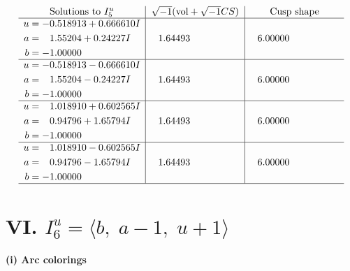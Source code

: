 \documentclass[1p]{elsarticle_modified}
\theoremstyle{definition}
\newcommand{\I}{\sqrt{-1}}
\begin{document}
$$\begin{array}{c|c|c}  
\text{Solutions to }I^u_{5}& \I (\text{vol} + \sqrt{-1}CS) & \text{Cusp shape}\\
 \hline 
\begin{aligned}
u &= -0.518913 + 0.666610 I \\
a &= \phantom{-}1.55204 + 0.24227 I \\
b &= -1.00000\phantom{ +0.000000I}\end{aligned}
 & \phantom{-}1.64493\phantom{ +0.000000I} & \phantom{-}6.00000\phantom{ +0.000000I} \\ \hline\begin{aligned}
u &= -0.518913 - 0.666610 I \\
a &= \phantom{-}1.55204 - 0.24227 I \\
b &= -1.00000\phantom{ +0.000000I}\end{aligned}
 & \phantom{-}1.64493\phantom{ +0.000000I} & \phantom{-}6.00000\phantom{ +0.000000I} \\ \hline\begin{aligned}
u &= \phantom{-}1.018910 + 0.602565 I \\
a &= \phantom{-}0.94796 + 1.65794 I \\
b &= -1.00000\phantom{ +0.000000I}\end{aligned}
 & \phantom{-}1.64493\phantom{ +0.000000I} & \phantom{-}6.00000\phantom{ +0.000000I} \\ \hline\begin{aligned}
u &= \phantom{-}1.018910 - 0.602565 I \\
a &= \phantom{-}0.94796 - 1.65794 I \\
b &= -1.00000\phantom{ +0.000000I}\end{aligned}
 & \phantom{-}1.64493\phantom{ +0.000000I} & \phantom{-}6.00000\phantom{ +0.000000I}\\
 \hline 
 \end{array}$$\newpage\newpage\renewcommand{\arraystretch}{1}
\centering \section*{VI. $I^u_{6}= \langle b,\;a-1,\;u+1 \rangle$}
\flushleft \textbf{(i) Arc colorings}\\
\end{document}
